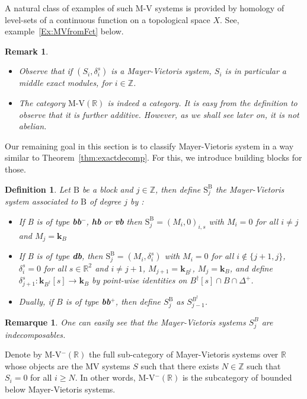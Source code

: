 \documentclass[a4paper, english, 11pt]{article}
\newcommand{\kk}[0]{\textbf{k}}
\newcommand{\0}{\vec{0}}
\newcommand{\R}[0]{\mathbb{R}}
\newcommand{\Z}[0]{\mathbb{Z}}
\newtheorem{rem}[prop]{Remarque}
\newtheorem{remark}[prop]{Remark}
\newtheorem{defi}[prop]{Definition}
\begin{document}
A natural class of examples of such M-V systems is provided by homology of level-sets of a  continuous function on a topological space $X$. See, example~\ref{Ex:MVfromFct} below.
\begin{remark}
\begin{itemize}
    \item Observe that if $(S_i,\delta_i^s)$ is a Mayer-Vietoris system, $S_i$ is in particular a middle exact modules, for $i\in \Z$. 
    \item The category $\text{M-V}(\R)$ is indeed a category. It is easy from the definition to observe that it is further additive. However, as we shall see later on, it is not abelian. 
\end{itemize}
\end{remark}

Our remaining goal in this section is to classify Mayer-Vietoris system in a way similar to Theorem~\ref{thm:exactdecomp}. For this, we introduce building blocks for those.
\begin{defi}\label{D:blocksmodulesforMV}
Let $\text{B}$ be a block and $j\in \Z$, then define $\text{S}^\text{B}_j$ the Mayer-Vietoris system associated to $\text{B}$ of degree $j$ by : 

\begin{itemize}
    \item If B is of type \textbf{bb}$^-$, \textbf{hb} or \textbf{vb} then $\text{S}^\text{B}_j = (M_i,0)_{i,s}$ with $M_i = 0$ for all $i\not = j$ and $M_j = \kk_B$
    
    \item If B is of type \textbf{db}, then $\text{S}^\text{B}_j = (M_i,\delta_i^s)$ with $M_i = 0$ for all $i\not \in \{j+1,j\} $, $\delta_i^s=0$ for all $s\in \R^2$ and $i\not = j+1$,  $M_{j+1} = \kk_{B^\dag}$, $M_{j}= \kk_{B}$, and define $\delta_{j+1}^s : \kk_{B^\dag}[s] \to \kk_B$ by point-wise identities on $B^\dag [s]\cap B \cap \Delta^+$.

    \item Dually, if $B$ is of type \textbf{bb$^+$}, then define $S^{\text{B}}_j$ as $S^{B^\dag}_{j-1}$.

    \end{itemize}  
\end{defi}


\begin{rem}
One can easily see that the Mayer-Vietoris systems $S_j^B$ are indecomposables.
\end{rem}

Denote by M-V$^- (\R)$ the full sub-category of Mayer-Vietoris systems over $\R$ whose objects are the MV systems $S$ such that there exists $N\in\Z$ such that $S_i = 0$ for all $i\geq N$. In other words, M-V$^- (\R)$ is the subcategory of bounded below Mayer-Vietoris systems.
\end{document}

